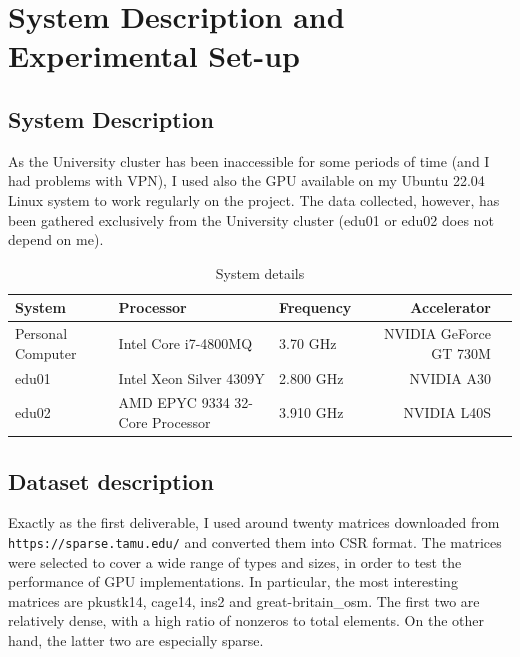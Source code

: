 \documentclass[conference]{IEEEtran}
\begin{document}
\section{System Description and Experimental Set-up}

\subsection{System Description}

As the University cluster has been inaccessible for some periods of time (and I had problems with VPN), I used also the GPU available on my Ubuntu 22.04 Linux system to work regularly on the project. The data collected, however, has been gathered exclusively from the University cluster (edu01 or edu02 does not depend on me).

\begin{table}[ht]
    \centering
    \begin{adjustbox}{width=\columnwidth}
    \begin{tabular}{lllrl}
    \toprule
    \textbf{System} &  \textbf{Processor} & \textbf{Frequency} & \textbf{Accelerator} \\
    \midrule
        Personal Computer &  Intel Core i7-4800MQ & 3.70 GHz & NVIDIA GeForce GT 730M \\
        edu01 & Intel Xeon Silver 4309Y & 2.800 GHz & NVIDIA A30 \\
        edu02 & AMD EPYC 9334 32-Core Processor & 3.910 GHz & NVIDIA L40S \\
    \bottomrule
    \end{tabular}
    \end{adjustbox}
    \vspace{1em}
    
    \caption{System details}
    \label{tab:system_description}
\end{table}

\subsection{Dataset description}

Exactly as the first deliverable, I used around twenty matrices downloaded from \texttt{https://sparse.tamu.edu/} and converted them into CSR format. The matrices were selected to cover a wide range of types and sizes, in order to test the performance of GPU implementations. In particular, the most interesting matrices are pkustk14, cage14, ins2 and great-britain\_osm. The first two are relatively dense, with a high ratio of nonzeros to total elements. On the other hand, the latter two are especially sparse.
\end{document}
